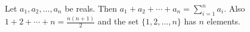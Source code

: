 Let $a_{1}, a_{2}, \ldots, a_{n}$ be reals.
Then $a_{1} + a_{2} + \cdots + a_{n} = \sum_{i=1}^{n} a_{i}$.
Also $1 + 2 + \cdots + n = \frac{n(n + 1)}{2}$ and the set $\{1, 2, \ldots, n\}$ has $n$ elements.